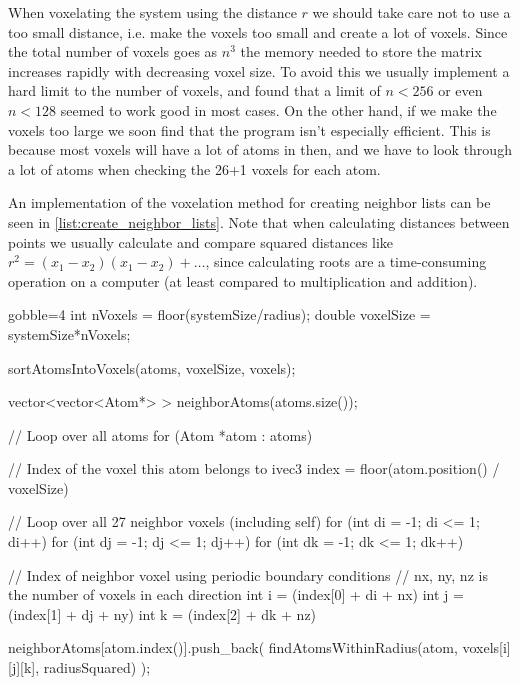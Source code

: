 When voxelating the system using the distance $r$ we should take care not to use a too small distance, i.e. make the voxels too small and create a lot of voxels. Since the total number of voxels goes as $n^3$ the memory needed to store the matrix increases rapidly with decreasing voxel size. To avoid this we usually implement a hard limit to the number of voxels, and found that a limit of $n < 256$ or even $n < 128$ seemed to work good in most cases. On the other hand, if we make the voxels too large we soon find that the program isn't especially efficient. This is because most voxels will have a lot of atoms in then, and we have to look through a lot of atoms when checking the 26+1 voxels for each atom.

An implementation of the voxelation method for creating neighbor lists can be seen in \cref{list:create_neighbor_lists}. Note that when calculating distances between points we usually calculate and compare squared distances like $r^2 = (x_1-x_2)(x_1-x_2) + \dots$, since calculating roots are a time-consuming operation on a computer (at least compared to multiplication and addition).
%
%
\begin{listing}[!htb]%
\begin{cppcode*}{gobble=4}
    int nVoxels = floor(systemSize/radius);
    double voxelSize = systemSize*nVoxels;
    
    sortAtomsIntoVoxels(atoms, voxelSize, voxels);
    
    vector<vector<Atom*> > neighborAtoms(atoms.size());
    
    // Loop over all atoms
    for (Atom *atom : atoms) {
        // Index of the voxel this atom belongs to
        ivec3 index = floor(atom.position() / voxelSize)
        
        // Loop over all 27 neighbor voxels (including self)
        for (int di = -1; di <= 1; di++)
        for (int dj = -1; dj <= 1; dj++)
        for (int dk = -1; dk <= 1; dk++)
        {{{
            // Index of neighbor voxel using periodic boundary conditions
            // nx, ny, nz is the number of voxels in each direction
            int i = (index[0] + di + nx) %
            int j = (index[1] + dj + ny) %
            int k = (index[2] + dk + nz) %
            
            neighborAtoms[atom.index()].push_back(
                findAtomsWithinRadius(atom, voxels[i][j][k], radiusSquared)
            );
        }}}
    }
\end{cppcode*}
\caption{%
    An example of how to find the neighbor atoms within a given distance () of all atoms. This example assumes a cubic system of size . See \cref{list:sortAtomsIntoVoxels,list:findAtomsWithinRadius} for example implentations of  and . %
    \label{list:create_neighbor_lists}%
}%
\end{listing}%
